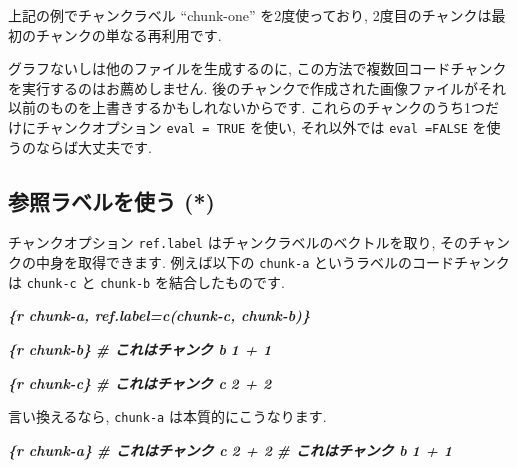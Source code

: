 \documentclass[
  11pt,
  lualatex,
  ja=standard]{bxjsreport}
\newenvironment{Shaded}{\begin{snugshade}}{\end{snugshade}}
\newcommand{\InformationTok}[1]{\textcolor[rgb]{0.56,0.35,0.01}{\textbf{\textit{#1}}}}
\begin{document}
上記の例でチャンクラベル ``chunk-one'' を2度使っており, 2度目のチャンクは最初のチャンクの単なる再利用です.

グラフないしは他のファイルを生成するのに, この方法で複数回コードチャンクを実行するのはお薦めしません. 後のチャンクで作成された画像ファイルがそれ以前のものを上書きするかもしれないからです. これらのチャンクのうち1つだけにチャンクオプション \texttt{eval = TRUE} を使い, それ以外では \texttt{eval =FALSE} を使うのならば大丈夫です.

\hypertarget{ref-label}{%
\subsection{参照ラベルを使う (*)}\label{ref-label}}

チャンクオプション \texttt{ref.label} はチャンクラベルのベクトルを取り, そのチャンクの中身を取得できます. 例えば以下の \texttt{chunk-a} というラベルのコードチャンクは \texttt{chunk-c} と \texttt{chunk-b} を結合したものです.

\begin{Shaded}
\begin{Highlighting}[]
\InformationTok{\textasciigrave{}\textasciigrave{}\textasciigrave{}\{r chunk{-}a, ref.label=c(\textquotesingle{}chunk{-}c\textquotesingle{}, \textquotesingle{}chunk{-}b\textquotesingle{})\}}
\InformationTok{\textasciigrave{}\textasciigrave{}\textasciigrave{}}

\InformationTok{\textasciigrave{}\textasciigrave{}\textasciigrave{}\{r chunk{-}b\}}
\InformationTok{\# これはチャンク b}
\InformationTok{1 + 1}
\InformationTok{\textasciigrave{}\textasciigrave{}\textasciigrave{}}

\InformationTok{\textasciigrave{}\textasciigrave{}\textasciigrave{}\{r chunk{-}c\}}
\InformationTok{\# これはチャンク c}
\InformationTok{2 + 2}
\InformationTok{\textasciigrave{}\textasciigrave{}\textasciigrave{}}
\end{Highlighting}
\end{Shaded}

言い換えるなら, \texttt{chunk-a} は本質的にこうなります.

\begin{Shaded}
\begin{Highlighting}[]
\InformationTok{\textasciigrave{}\textasciigrave{}\textasciigrave{}\{r chunk{-}a\}}
\InformationTok{\# これはチャンク c}
\InformationTok{2 + 2}
\InformationTok{\# これはチャンク b}
\InformationTok{1 + 1}
\InformationTok{\textasciigrave{}\textasciigrave{}\textasciigrave{}}
\end{Highlighting}
\end{Shaded}
\end{document}
